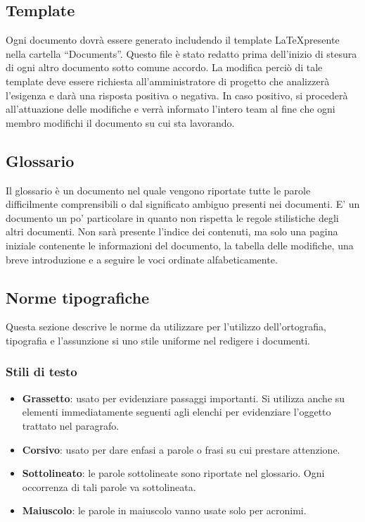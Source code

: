 \subsection{Template}
Ogni documento dovrà essere generato includendo il template \LaTeX presente nella cartella ``Documents''. Questo file è stato redatto prima dell'inizio di stesura di ogni altro documento sotto comune accordo. La modifica perciò di tale template deve essere richiesta all'amministratore di progetto che analizzerà l'esigenza e darà una risposta positiva o negativa. In caso positivo, si procederà all'attuazione delle modifiche e verrà informato l'intero team al fine che ogni membro modifichi il documento su cui sta lavorando.

\subsection{Glossario}
Il glossario è un documento nel quale vengono riportate tutte le parole difficilmente comprensibili o dal significato ambiguo presenti nei documenti. E' un documento un po' particolare in quanto non rispetta le regole stilistiche degli altri documenti. Non sarà presente l'indice dei contenuti, ma solo una pagina iniziale contenente le informazioni del documento, la tabella delle modifiche, una breve introduzione e a seguire le voci ordinate alfabeticamente.

\subsection{Norme tipografiche}
Questa sezione descrive le norme da utilizzare per l'utilizzo dell'ortografia, tipografia e l'assunzione si uno stile uniforme nel redigere i documenti.

\subsubsection{Stili di testo}
\begin{itemize}
\item \textbf{Grassetto}: usato per evidenziare passaggi importanti. Si utilizza anche su elementi immediatamente seguenti agli elenchi per evidenziare l'oggetto trattato nel paragrafo.
\item \textbf{Corsivo}: usato per dare enfasi a parole o frasi su cui prestare attenzione.
\item \textbf{Sottolineato}: le parole sottolineate sono riportate nel glossario. Ogni occorrenza di tali parole va sottolineata.
\item \textbf{Maiuscolo}: le parole in maiuscolo vanno usate solo per acronimi.
\end{itemize}

